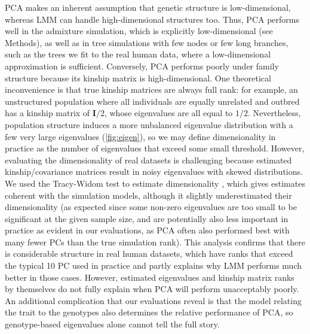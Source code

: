 \documentclass[11pt]{article}
\begin{document}
PCA makes an inherent assumption that genetic structure is low-dimensional, whereas LMM can handle high-dimensional structures too.
Thus, PCA performs well in the admixture simulation, which is explicitly low-dimensional (see Methods), as well as in tree simulations with few nodes or few long branches, such as the trees we fit to the real human data, where a low-dimensional approximation is sufficient.
Conversely, PCA performs poorly under family structure because its kinship matrix is high-dimensional.
One theoretical inconvenience is that true kinship matrices are always full rank: for example, an unstructured population where all individuals are equally unrelated and outbred has a kinship matrix of $\mathbf{I}/2$, whose eigenvalues are all equal to $1/2$.
Nevertheless, population structure induces a more unbalanced eigenvalue distribution with a few very large eigenvalues (\cref{fig:eigen}), so we may define dimensionality in practice as the number of eigenvalues that exceed some small threshold.
However, evaluating the dimensionality of real datasets is challenging because estimated kinship/covariance matrices result in noisy eigenvalues with skewed distributions.
We used the Tracy-Widom test to estimate dimensionality \citep{patterson_population_2006}, which gives estimates coherent with the simulation models, although it slightly underestimated their dimensionality (as expected since some non-zero eigenvalues are too small to be significant at the given sample size, and are potentially also less important in practice as evident in our evaluations, as PCA often also performed best with many fewer PCs than the true simulation rank).
This analysis confirms that there is considerable structure in real human datasets, which have ranks that exceed the typical 10 PC used in practice and partly explains why LMM performs much better in those cases.
However, estimated eigenvalues and kinship matrix ranks by themselves do not fully explain when PCA will perform unacceptably poorly.
An additional complication that our evaluations reveal is that the model relating the trait to the genotypes also determines the relative performance of PCA, so genotype-based eigenvalues alone cannot tell the full story.
\end{document}
